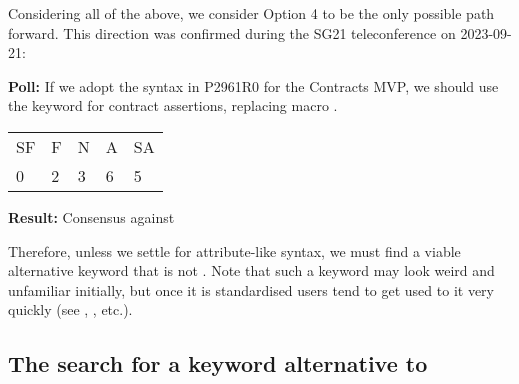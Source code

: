 Considering all of the above, we consider Option 4 to be the only possible path forward. This direction was confirmed during the SG21 teleconference on 2023-09-21:

\begin{adjustwidth}{0.5cm}{0.5cm}
\textbf{Poll:} If we adopt the syntax in P2961R0 for the Contracts MVP, we should use the keyword  for contract assertions, replacing macro .

\begin{tabular}{lllll}
SF & F & N & A & SA \\
0 & 2 & 3 & 6 & 5
\end{tabular}

\textbf{Result:} Consensus against
\end{adjustwidth}

Therefore, unless we settle for attribute-like syntax, we must find a viable alternative keyword that is not . Note that such a keyword may look weird and unfamiliar initially, but once it is standardised users tend to get used to it very quickly (see , , etc.).

\subsection{The search for a keyword alternative to }
\label{subsec:keyword}

